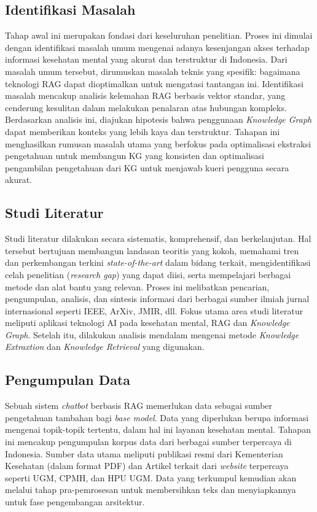\subsection{Identifikasi Masalah}
Tahap awal ini merupakan fondasi dari keseluruhan penelitian. Proses ini dimulai dengan identifikasi masalah umum mengenai adanya kesenjangan akses terhadap informasi kesehatan mental yang akurat dan terstruktur di Indonesia.
Dari masalah umum tersebut, dirumuskan masalah teknis yang spesifik: bagaimana teknologi RAG dapat dioptimalkan untuk mengatasi tantangan ini.
Identifikasi masalah mencakup analisis kelemahan RAG berbasis vektor standar, yang cenderung kesulitan dalam melakukan penalaran atas hubungan kompleks.
Berdasarkan analisis ini, diajukan hipotesis bahwa penggunaan \textit{Knowledge Graph} dapat memberikan konteks yang lebih kaya dan terstruktur.
Tahapan ini menghasilkan rumusan masalah utama yang berfokus pada optimalisasi ekstraksi pengetahuan untuk membangun KG yang konsisten dan optimalisasi pengambilan pengetahuan dari KG untuk menjawab kueri pengguna secara akurat.

\subsection{Studi Literatur}
Studi literatur dilakukan secara sistematis, komprehensif, dan berkelanjutan.
Hal tersebut bertujuan membangun landasan teoritis yang kokoh, memahami tren dan perkembangan terkini \textit{state-of-the-art} dalam bidang terkait, mengidentifikasi celah penelitian (\textit{research gap}) yang dapat diisi, serta mempelajari berbagai metode dan alat bantu yang relevan.
Proses ini melibatkan pencarian, pengumpulan, analisis, dan sintesis informasi dari berbagai sumber ilmiah jurnal internasional seperti IEEE, ArXiv, JMIR, dll.
Fokus utama area studi literatur meliputi aplikasi teknologi AI pada kesehatan mental, RAG dan \textit{Knowledge Graph}.
Setelah itu, dilakukan analisis mendalam mengenai metode \textit{Knowledge Extraxtion} dan \textit{Knowledge Retrieval} yang digunakan.

\subsection{Pengumpulan Data}
Sebuah sistem \textit{chatbot} berbasis RAG memerlukan data sebagai sumber pengetahuan tambahan bagi \textit{base model}.
Data yang diperlukan berupa informasi mengenai topik-topik tertentu, dalam hal ini layanan kesehatan mental.
Tahapan ini mencakup pengumpulan korpus data dari berbagai sumber terpercaya di Indonesia.
Sumber data utama meliputi publikasi resmi dari Kementerian Kesehatan (dalam format PDF) dan Artikel terkait dari \textit{website} terpercaya seperti UGM, CPMH, dan HPU UGM.
Data yang terkumpul kemudian akan melalui tahap pra-pemrosesan untuk membersihkan teks dan menyiapkannya untuk fase pengembangan arsitektur.

